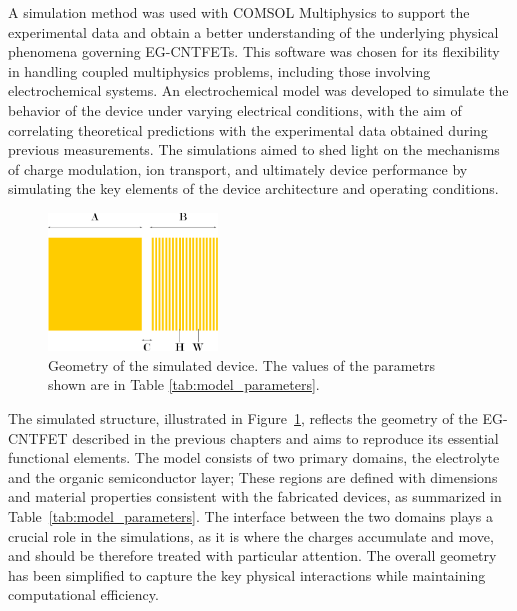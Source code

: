 
A simulation method was used with COMSOL Multiphysics to support the experimental data and obtain a better understanding of the underlying physical phenomena governing EG-CNTFETs. This software was chosen for its flexibility in handling coupled multiphysics problems, including those involving electrochemical systems. An electrochemical model was developed to simulate the behavior of the device under varying electrical conditions, with the aim of correlating theoretical predictions with the experimental data obtained during previous measurements. The simulations aimed to shed light on the mechanisms of charge modulation, ion transport, and ultimately device performance by simulating the key elements of the device architecture and operating conditions.

\begin{figure}
    \centering
    \includegraphics[width = 0.4\textwidth]{figures/chapter5/structure_params.pdf}
    \caption{Geometry of the simulated device. The values of the parametrs shown are in Table \ref{tab:model_parameters}.}
    \label{fig:simulParams}
\end{figure}

The simulated structure, illustrated in Figure~\ref{fig:simulParams}, reflects the geometry of the EG-CNTFET described in the previous chapters and aims to reproduce its essential functional elements. The model consists of two primary domains, the electrolyte and the organic semiconductor layer; These regions are defined with dimensions and material properties consistent with the fabricated devices, as summarized in Table~\ref{tab:model_parameters}. The interface between the two domains plays a crucial role in the simulations, as it is where the charges accumulate and move, and should be therefore treated with particular attention. The overall geometry has been simplified to capture the key physical interactions while maintaining computational efficiency.

